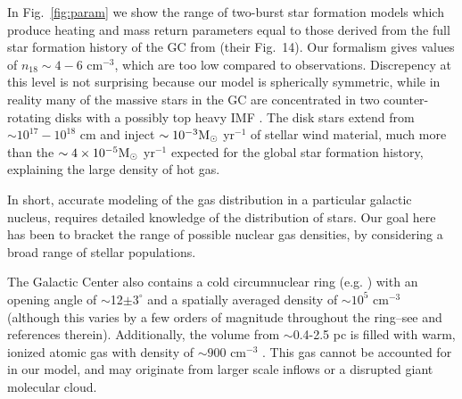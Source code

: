 \documentclass[usenatbib,fleqn]{mnras}
\newcommand{\Msun}{{\rm M_\odot}}
\begin{document}
In Fig.~\ref{fig:param} we show the range of two-burst star formation
models which produce heating and mass return parameters equal to those
derived from the full star formation history of the GC from
\citet{Pfuhl+2011} (their Fig.~14).  Our formalism gives values of
$n_{18}\sim 4-6$ cm$^{-3}$, which are too low compared to
observations.  Discrepency at this level is not surprising because our
model is spherically symmetric, while in reality many of the massive
stars in the GC are concentrated in two counter-rotating disks
\citep{Genzel+2003} with a possibly top heavy IMF \citep{Bartko+2010}.  The
disk stars extend from $\sim 10^{17}-10^{18}$ cm and inject $\sim
10^{-3} \Msun$ yr$^{-1}$ of stellar wind material, much more than the
$\sim 4 \times 10^{-5} \Msun$ yr$^{-1}$ expected for the global star
formation history, explaining the large density of hot gas.

In short, accurate modeling of the gas distribution in a particular
galactic nucleus, requires detailed knowledge of the distribution of
stars. Our goal here has been to bracket the range of possible nuclear gas
densities, by considering a broad range of stellar populations.

The Galactic Center also contains a cold circumnuclear ring
(e.g. \citealt{Becklin+1982}) with an opening angle of
$\sim$12$\pm3^{\circ}$ \citep{Lau+2013} and a spatially averaged
density of $\sim 10^{5}$ cm$^{-3}$ (although this varies by a few
orders of magnitude throughout the ring--see \citealt{Ferriere2012} and
references therein). Additionally, the volume from $\sim$0.4-2.5 pc
is filled with warm, ionized atomic gas with density of $\sim 900$
cm$^{-3}$ \citep{Ferriere2012}. This gas cannot be accounted for in
our model, and may originate from larger scale inflows or a disrupted
giant molecular cloud.
\end{document}
